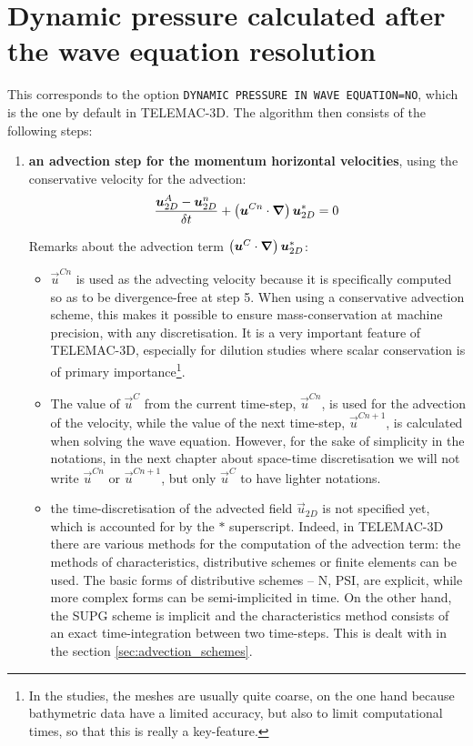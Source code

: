 \section{Dynamic pressure calculated after the wave equation 
resolution}
This corresponds to the option \texttt{DYNAMIC PRESSURE IN WAVE EQUATION=NO}, 
which is the one by default in TELEMAC-3D. The algorithm then consists of 
the following steps:
\begin{enumerate}
\item \textbf{an advection step for the momentum horizontal velocities}, 
using the conservative velocity for the advection:
\begin{equation}
    \dfrac{\vec{u}_{2D}^{A}-\vec{u}_{2D}^n}{\delta t} 
    + \left(\vec{u}^{Cn}\cdot\Grad\right)\vec{u}_{2D}^{*}=0 \medskip \\
\end{equation}
\begin{CommentBlock}{Remarks about the advection term $\left(\bm{u}^{C}\cdot\bm{\nabla}\right)\bm{u}_{2D}^{*}$:}
\begin{itemize}
\item $\vec{u}^{Cn}$ is used as the advecting velocity because it is 
specifically computed so as to be divergence-free at step 5. 
When using a conservative advection scheme, this makes it possible to ensure mass-conservation 
at machine precision, with any discretisation.
It is a very important feature of TELEMAC-3D, especially for dilution studies where scalar conservation is
of primary importance\footnote{In the studies, the meshes are usually quite coarse,
on the one hand because bathymetric data have a limited accuracy, but also to limit
computational times, so that this is really a key-feature.}.
\item The value of $\vec{u}^{C}$ from the current time-step, $\vec{u}^{Cn}$, is used for the advection of the velocity,
while the value of the next time-step, $\vec{u}^{Cn+1}$, is calculated when solving the wave equation.
However, for the sake of simplicity in the notations, in the next chapter about space-time discretisation
we will not write $\vec{u}^{Cn}$ or $\vec{u}^{Cn+1}$, but only $\vec{u}^{C}$ to have lighter notations.
\item the time-discretisation of the advected field $\vec{u}_{2D}$ is not specified yet, which is accounted for by the $*$ superscript. 
Indeed, in TELEMAC-3D there are various methods for the computation
of the advection term: the methods of characteristics, distributive schemes or finite elements can be used.
The basic forms of distributive schemes -- N, PSI, are explicit, while more complex forms can be semi-implicited
in time. On the other hand, the SUPG scheme is implicit and the characteristics method consists of an exact
time-integration between two time-steps. This is dealt with in the section \ref{sec:advection_schemes}.
\end{itemize}
\end{CommentBlock}


\end{enumerate}
